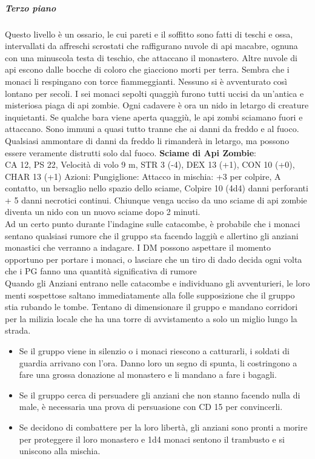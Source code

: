 \documentclass{article}
\begin{document}
    \subparagraph{Terzo piano}
    Questo livello è un ossario, le cui pareti e il soffitto sono fatti di teschi e ossa, intervallati da affreschi scrostati che raffigurano nuvole di api macabre, ognuna con una minuscola testa di teschio, che attaccano il monastero. Altre nuvole di api escono dalle bocche di coloro che giacciono morti per terra. Sembra che i monaci li respingano con torce fiammeggianti.
Nessuno si è avventurato così lontano per secoli.
I sei monaci sepolti quaggiù furono tutti uccisi da un'antica e misteriosa piaga di api zombie.
Ogni cadavere è ora un nido in letargo di creature inquietanti. Se qualche bara viene aperta quaggiù, le api zombi sciamano fuori e attaccano. Sono immuni a quasi tutto tranne che ai danni da freddo e al fuoco. Qualsiasi ammontare di danni da freddo li rimanderà in letargo, ma possono essere veramente distrutti solo dal fuoco.
    \textbf{Sciame di Api Zombie}:\\
    CA 12, PS 22, Velocità di volo 9 m,
STR 3 (-4), DEX 13 (+1), CON 10 (+0),
CHAR 13 (+1)
Azioni: Pungiglione: Attacco in mischia: +3 per colpire, A contatto, un bersaglio nello spazio dello sciame, Colpire 10 (4d4) danni perforanti + 5 danni necrotici continui.
Chiunque venga ucciso da uno sciame di api zombie diventa un nido con un nuovo sciame dopo 2 minuti.
\\
Ad un certo punto durante l'indagine sulle catacombe, è probabile che i monaci sentano qualsiasi rumore che il gruppo sta facendo laggiù e allertino gli anziani monastici che verranno a indagare.
I DM possono aspettare il momento opportuno per portare i monaci, o lasciare che un tiro di dado decida ogni volta che i PG fanno una quantità significativa di rumore
\\
Quando gli Anziani entrano nelle catacombe e individuano gli avventurieri, le loro menti sospettose saltano immediatamente alla folle supposizione che il gruppo stia rubando le tombe. Tentano di dimensionare il gruppo e mandano corridori per la milizia locale che ha una torre di avvistamento a solo un miglio lungo la strada.
\\

\begin{itemize}
    \item Se il gruppo viene in silenzio o i monaci riescono a catturarli, i soldati di guardia arrivano con l'ora. Danno loro un segno di spunta, li costringono a fare una grossa donazione al monastero e li mandano a fare i bagagli.
    \item Se il gruppo cerca di persuadere gli anziani che non stanno facendo nulla di male, è necessaria una prova di persuasione con CD 15 per convincerli.
    \item Se decidono di combattere per la loro libertà, gli anziani sono pronti a morire per proteggere il loro monastero e 1d4 monaci sentono il trambusto e si uniscono alla mischia.
\end{itemize}
\end{document}
